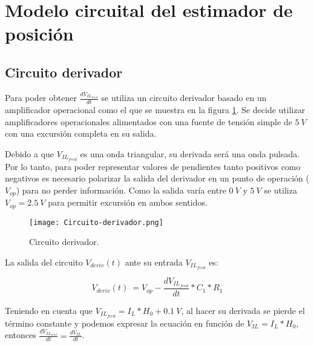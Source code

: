 {
	
}


\section{Modelo circuital del estimador de posición}

\subsection{Circuito derivador}

Para poder obtener $\frac{dV_{IL_{feed}}}{dt}$ se utiliza un circuito derivador basado en un amplificador operacional como el que se muestra en la figura \ref{fig:img_Circuito-derivador}. Se decide utilizar amplificadores operacionales alimentados con una fuente de tensión simple de $5\:V$ con una excursión completa en su salida. 

Debido a que $V_{IL_{feed}}$ es una onda triangular, su derivada será una onda pulsada. Por lo tanto, para poder representar valores de pendientes tanto positivos como negativos es necesario polarizar la salida del derivador en un punto de operación ($V_{op}$) para no perder información. Como la salida varía entre $0\:V$ y $5\:V$ se utiliza $V_{op}=2.5\:V$ para permitir excursión en ambos sentidos.

\begin{figure}[H]
	\centering
	\texttt{[image: Circuito-derivador.png]}
	\caption{Circuito derivador.}
	\label{fig:img_Circuito-derivador}
\end{figure}


La salida del circuito $V_{deriv}(t)$ ante su entrada $V_{IL_{feed}}$ es:

\begin{equation} 
	V_{deriv}(t)\ = V_{op} - \frac{dV_{IL_{feed}}}{dt}*C_1*R_1
\end{equation}

Teniendo en cuenta que $V_{IL_{feed}}=I_L*H_0+0.1\:V$, al hacer su derivada se pierde el término constante y podemos expresar la ecuación en función de $V_{IL}=I_L*H_0$, entonces $ \frac{dV_{IL_{feed}}}{dt}= \frac{dV_{IL}}{dt}$.

